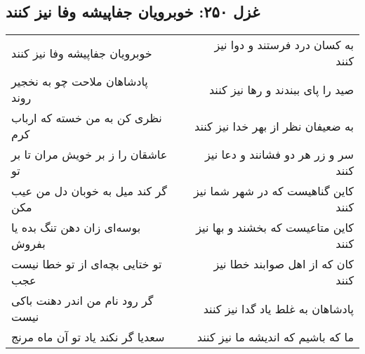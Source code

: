 \begin{center}
\section*{غزل ۲۵۰: خوبرویان جفاپیشه وفا نیز کنند}
\label{sec:250}
\begin{longtable}{l p{0.5cm} r}
خوبرویان جفاپیشه وفا نیز کنند
&&
به کسان درد فرستند و دوا نیز کنند
\\
پادشاهان ملاحت چو به نخجیر روند
&&
صید را پای ببندند و رها نیز کنند
\\
نظری کن به من خسته که ارباب کرم
&&
به ضعیفان نظر از بهر خدا نیز کنند
\\
عاشقان را ز بر خویش مران تا بر تو
&&
سر و زر هر دو فشانند و دعا نیز کنند
\\
گر کند میل به خوبان دل من عیب مکن
&&
کاین گناهیست که در شهر شما نیز کنند
\\
بوسه‌ای زان دهن تنگ بده یا بفروش
&&
کاین متاعیست که بخشند و بها نیز کنند
\\
تو ختایی بچه‌ای از تو خطا نیست عجب
&&
کان که از اهل صوابند خطا نیز کنند
\\
گر رود نام من اندر دهنت باکی نیست
&&
پادشاهان به غلط یاد گدا نیز کنند
\\
سعدیا گر نکند یاد تو آن ماه مرنج
&&
ما که باشیم که اندیشه ما نیز کنند
\\
\end{longtable}
\end{center}
